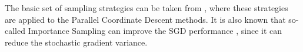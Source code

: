 \documentclass{article}
\begin{document}
	The basic set of sampling strategies can be taken from \cite{richtarik2016parallel}, where these strategies are applied to the Parallel Coordinate Descent methods. It is also known that so-called Importance Sampling can improve the SGD performance \cite{https://doi.org/10.48550/arxiv.1401.2753, 9413313}, since it can reduce the stochastic gradient variance. \\
	
	
	
\renewcommand\refname{References}	


\end{document}
